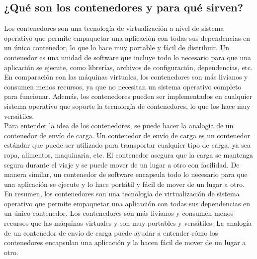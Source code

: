 \documentclass{article}
\begin{document}
\subsection{¿Qué son los contenedores y para qué sirven?}
Los contenedores son una tecnología de virtualización a nivel de sistema operativo que permite empaquetar una aplicación con todas sus dependencias en un único contenedor, lo que lo hace muy portable y fácil de distribuir. Un contenedor es una unidad de software que incluye todo lo necesario para que una aplicación se ejecute, como librerías, archivos de configuración, dependencias, etc.
\\
En comparación con las máquinas virtuales, los contenedores son más livianos y consumen menos recursos, ya que no necesitan un sistema operativo completo para funcionar. Además, los contenedores pueden ser implementados en cualquier sistema operativo que soporte la tecnología de contenedores, lo que los hace muy versátiles.
\\
Para entender la idea de los contenedores, se puede hacer la analogía de un contenedor de envío de carga. Un contenedor de envío de carga es un contenedor estándar que puede ser utilizado para transportar cualquier tipo de carga, ya sea ropa, alimentos, maquinaria, etc. El contenedor asegura que la carga se mantenga segura durante el viaje y se puede mover de un lugar a otro con facilidad. De manera similar, un contenedor de software encapsula todo lo necesario para que una aplicación se ejecute y lo hace portátil y fácil de mover de un lugar a otro.
\\
En resumen, los contenedores son una tecnología de virtualización de sistema operativo que permite empaquetar una aplicación con todas sus dependencias en un único contenedor. Los contenedores son más livianos y consumen menos recursos que las máquinas virtuales y son muy portables y versátiles. La analogía de un contenedor de envío de carga puede ayudar a entender cómo los contenedores encapsulan una aplicación y la hacen fácil de mover de un lugar a otro.
\end{document}

